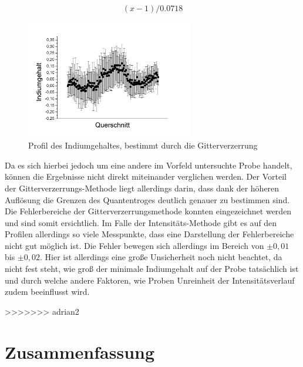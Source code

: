 \documentclass[a4paper,11pt,DIV=11]{scrartcl}
\begin{document}
\begin{align*}
	(x-1) / 0.0718
\end{align*}

\begin{figure}[H]\centering
	\includegraphics[width=0.65\textwidth]{Versuchsdaten/13/Graph01.png}
\caption{Profil des Indiumgehaltes, bestimmt durch die Gitterverzerrung}
\label{hochindium}
\end{figure}

Da es sich hierbei jedoch um eine andere im Vorfeld untersuchte Probe handelt, können die Ergebnisse nicht direkt miteinander verglichen werden. Der Vorteil der Gitterverzerrungs-Methode liegt allerdings darin, dass dank der höheren Auflösung die Grenzen des Quantentroges deutlich genauer zu bestimmen sind. \\
Die Fehlerbereiche der Gitterverzerrungsmethode konnten eingezeichnet werden und sind somit ersichtlich. Im Falle der Intensitäts-Methode gibt es auf den Profilen allerdings so viele Messpunkte, dass eine Darstellung der Fehlerbereiche nicht gut möglich ist. Die Fehler bewegen sich allerdings im Bereich von $\pm0,01$ bis $\pm0,02$. Hier ist allerdings eine große Unsicherheit noch nicht beachtet, da nicht fest steht, wie groß der minimale Indiumgehalt auf der Probe tatsächlich ist und durch welche andere Faktoren, wie Proben Unreinheit der Intensitätsverlauf zudem beeinflusst wird.


>>>>>>> adrian2
\section{Zusammenfassung}
\end{document}
